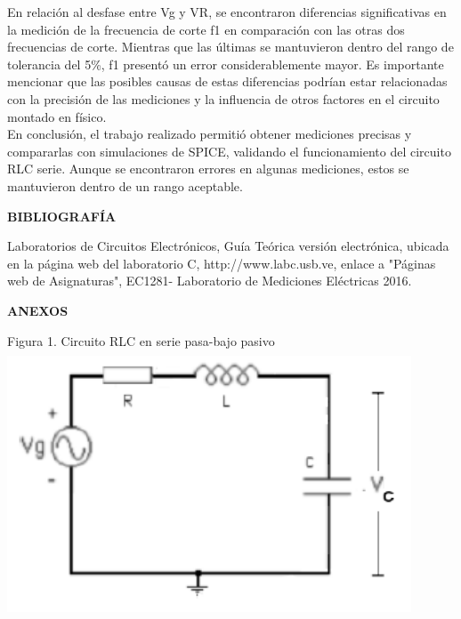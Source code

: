 \documentclass[12pt]{article}
\begin{document}
    En relación al desfase entre Vg y VR, se encontraron diferencias significativas en la medición de la frecuencia de corte f1 en comparación con las otras dos frecuencias de corte. Mientras que las últimas se mantuvieron dentro del rango de tolerancia del 5\%, f1 presentó un error considerablemente mayor. Es importante mencionar que las posibles causas de estas diferencias podrían estar relacionadas con la precisión de las mediciones y la influencia de otros factores en el circuito montado en físico.\\
    
    En conclusión, el trabajo realizado permitió obtener mediciones precisas y compararlas con simulaciones de SPICE, validando el funcionamiento del circuito RLC serie. Aunque se encontraron errores en algunas mediciones, estos se mantuvieron dentro de un rango aceptable. \\
    
    \newpage
    
    \begin{center}
        \textbf{\large BIBLIOGRAFÍA}\\
    \end{center}
    
    \noindent Laboratorios de Circuitos Electrónicos, Guía Teórica versión electrónica, ubicada en la página web del laboratorio C, http://www.labc.usb.ve, enlace a "Páginas web de Asignaturas", EC1281- Laboratorio de Mediciones Eléctricas 2016.
    
    \newpage
    
    \begin{center}
        \textbf{\large ANEXOS}\\
    \end{center}
    \noindent Figura 1. Circuito RLC en serie pasa-bajo pasivo\\
    \includegraphics[width=12cm,height=8cm]{Img/pasa-baja}
    
\end{document}
